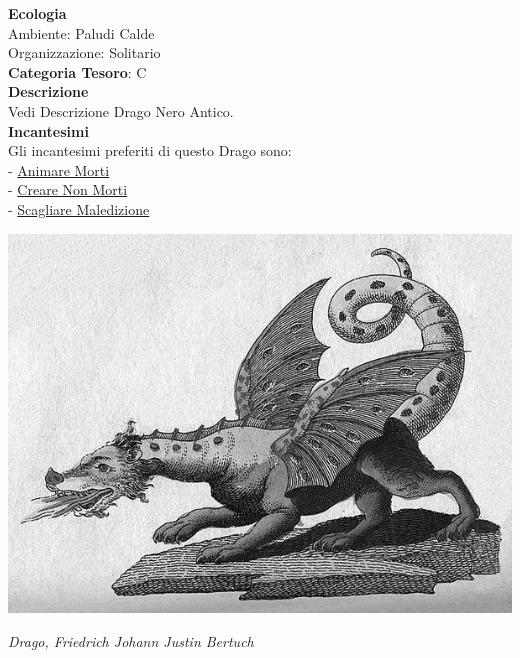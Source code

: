 \begin{multicols}{2}
{\textbf{Ecologia}\\
Ambiente: Paludi Calde\\
Organizzazione: Solitario\\
\textbf{Categoria Tesoro}: C\\
\textbf{Descrizione}\\
Vedi Descrizione Drago Nero Antico.\\
\textbf{Incantesimi}\\
Gli incantesimi preferiti di questo Drago sono:\\
- \hyperlink{Animare Morti}{Animare Morti}\\
- \hyperlink{Creare Non Morti}{Creare Non Morti}\\
- \hyperlink{Scagliare Maledizione}{Scagliare Maledizione}

\medskip

\begin{center}
	\includegraphics[width=0.9\linewidth]{immagini/Friedrich-Johann-Justin-Bertuch_Mythical-Creature-Dragon_1806.png}

	\emph{Drago, Friedrich Johann Justin Bertuch}
\end{center}

}
\end{multicols}
